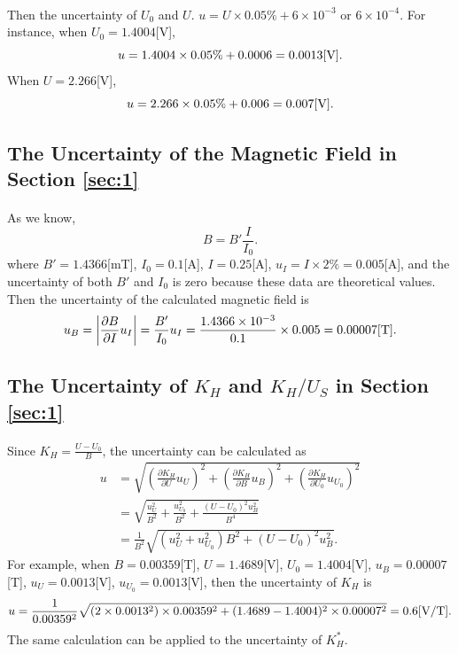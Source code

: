 \documentclass[a4paper]{article}
\begin{document}
    \paragraph{} Then the uncertainty of $U_0$ and $U$. $u=U\times 0.05\%+6\times 10^{-3} \text{ or }6\times 10^{-4}$. For instance, when $U_0=1.4004$[V], $$u=1.4004\times 0.05\%+0.0006=0.0013[\rm V].$$ When $U=2.266$[V], $$u=2.266\times 0.05\%+0.006=0.007[\rm V].$$
    \subsection{The Uncertainty of the Magnetic Field in Section \ref{sec:1}}
    \paragraph{} As we know, $$B=B'\frac{I}{I_0}.$$ where $B'=1.4366$[mT], $I_0=0.1$[A], $I=0.25$[A], $u_I=I\times 2\%=0.005$[A], and the uncertainty of both $B'$ and $I_0$ is zero because these data are theoretical values. Then the uncertainty of the calculated magnetic field is $$u_B=\left|\frac{\partial B}{\partial I}u_I\right|=\frac{B'}{I_0}u_I=\frac{1.4366\times 10^{-3}}{0.1}\times 0.005=0.00007[\rm T].$$
    \subsection{The Uncertainty of $K_H$ and $K_H/U_S$ in Section \ref{sec:1}}
    \paragraph{} Since $K_H=\frac{U-U_0}{B}$, the uncertainty can be calculated as \begin{equation*}
        \begin{split}
            u&=\sqrt{\left(\frac{\partial K_H}{\partial U}u_U\right)^2+\left(\frac{\partial K_H}{\partial B}u_B\right)^2+\left(\frac{\partial K_H}{\partial U_0}u_{U_0}\right)^2}\\
            &=\sqrt{\frac{u_U^2}{B^2}+\frac{u_{U_0}^2}{B^2}+\frac{(U-U_0)^2u_B^2}{B^4}}\\
            &=\frac{1}{B^2}\sqrt{(u_U^2+u_{U_0}^2)B^2+(U-U_0)^2u_B^2}.
        \end{split}
    \end{equation*}
    For example, when $B=0.00359$[T], $U=1.4689$[V], $U_0=1.4004$[V], $u_B=0.00007$[T], $u_U=0.0013$[V], $u_{U_0}=0.0013$[V], then the uncertainty of $K_H$ is $$u=\frac{1}{0.00359^2}\sqrt{(2\times 0.0013^2)\times 0.00359^2+(1.4689-1.4004)^2\times 0.00007^2}=0.6[\rm V/T].$$
    The same calculation can be applied to the uncertainty of $K_H^*$.
    \vspace{-5mm}
\end{document}

